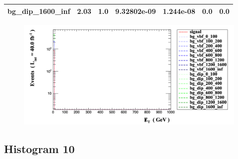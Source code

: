 \documentclass[a4paper, 10pt]{article}
\begin{document}
\begin{table}[H]
\begin{center}
\begin{tabular}{|m{23.0mm}|m{23.0mm}|m{18.0mm}|m{19.0mm}|m{19.0mm}|m{19.0mm}|m{19.0mm}|}
      \hline
      {\cellcolor{white}         bg\_dip\_1600\_inf}& {\cellcolor{white}         2.03}& {\cellcolor{white}         1.0}& {\cellcolor{white}         9.32802e-09}& {\cellcolor{white}         1.244e-08}& {\cellcolor{green}         0.0}& {\cellcolor{green}         0.0}\\
\hline
    \end{tabular}
  \end{center}
\end{table}

\begin{figure}[H]
  \begin{center}
    \includegraphics[scale=0.45]{selection_8.png}\\
\caption{   }
  \end{center}
\end{figure}
      \newpage
\subsection{ Histogram 10}
\end{document}
